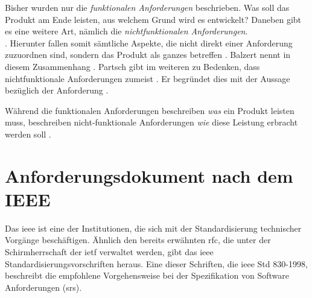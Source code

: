 Bisher wurden nur die \textit{funktionalen Anforderungen} beschrieben. Was soll das Produkt am Ende leisten, aus welchem Grund wird es entwickelt? Daneben gibt es eine weitere Art, nämlich die \textit{nichtfunktionalen Anforderungen}. \\  \citep[][S. 27 f.]{Partsch2010}.
Hierunter fallen somit sämtliche Aspekte, die nicht direkt einer Anforderung zuzuordnen sind, sondern das Produkt als ganzes betreffen \citep[vgl.][463]{Balzert2010}. Balzert nennt in diesem Zusammenhang  \citep[][463]{Balzert2010}. 
Partsch gibt im weiteren zu Bedenken, dass nichtfunktionale Anforderungen zumeist  \citep[][30]{Partsch2010}. Er begründet dies mit der Aussage bezüglich der Anforderung  \citep[][30]{Partsch2010}.

Während die funktionalen Anforderungen beschreiben \textit{was} ein Produkt leisten muss, beschreiben nicht-funktionale Anforderungen \textit{wie} diese Leistung erbracht werden soll \citep[vgl.][30]{Partsch2010}.



\section{Anforderungsdokument nach dem IEEE}
Das \ac{ieee} ist eine der Institutionen, die sich mit der Standardisierung technischer Vorgänge beschäftigen. Ähnlich den bereits erwähnten \ac{rfc}, die unter der Schirmherrschaft der \ac{ietf} verwaltet werden, gibt das \ac{ieee} Standardisierungsvorschriften heraus. Eine dieser Schriften, die \ac{ieee} Std 830-1998, beschreibt die empfohlene Vorgehensweise bei der Spezifikation von Software Anforderungen (\ac{srs}).

